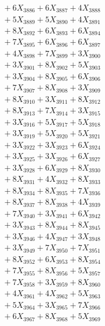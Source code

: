 \documentclass[a4paper,10pt]{article}
\begin{document}
{\begin{align}
&\;  + 6 X_{3886} + 6 X_{3887} + 4 X_{3888} \\[0.3ex]
&\;  + 5 X_{3889} + 5 X_{3890} + 4 X_{3891} \\[0.3ex]
&\;  + 8 X_{3892} + 6 X_{3893} + 6 X_{3894} \\[0.3ex]
&\;  + 7 X_{3895} + 6 X_{3896} + 6 X_{3897} \\[0.3ex]
&\;  + 4 X_{3898} + 7 X_{3899} + 3 X_{3900} \\[0.3ex]
&\;  + 3 X_{3901} + 8 X_{3902} + 5 X_{3903} \\[0.3ex]
&\;  + 3 X_{3904} + 8 X_{3905} + 6 X_{3906} \\[0.3ex]
&\;  + 7 X_{3907} + 8 X_{3908} + 3 X_{3909} \\[0.5ex]\allowbreak
&\;  + 8 X_{3910} + 3 X_{3911} + 8 X_{3912} \\[0.3ex]
&\;  + 8 X_{3913} + 7 X_{3914} + 3 X_{3915} \\[0.3ex]
&\;  + 3 X_{3916} + 5 X_{3917} + 5 X_{3918} \\[0.3ex]
&\;  + 3 X_{3919} + 5 X_{3920} + 5 X_{3921} \\[0.3ex]
&\;  + 3 X_{3922} + 3 X_{3923} + 6 X_{3924} \\[0.3ex]
&\;  + 3 X_{3925} + 3 X_{3926} + 6 X_{3927} \\[0.3ex]
&\;  + 3 X_{3928} + 6 X_{3929} + 8 X_{3930} \\[0.3ex]
&\;  + 8 X_{3931} + 4 X_{3932} + 8 X_{3933} \\[0.3ex]
&\;  + 8 X_{3934} + 8 X_{3935} + 7 X_{3936} \\[0.3ex]
&\;  + 8 X_{3937} + 8 X_{3938} + 4 X_{3939} \\[0.5ex]\allowbreak
&\;  + 7 X_{3940} + 3 X_{3941} + 6 X_{3942} \\[0.3ex]
&\;  + 3 X_{3943} + 8 X_{3944} + 8 X_{3945} \\[0.3ex]
&\;  + 3 X_{3946} + 4 X_{3947} + 3 X_{3948} \\[0.3ex]
&\;  + 3 X_{3949} + 7 X_{3950} + 7 X_{3951} \\[0.3ex]
&\;  + 8 X_{3952} + 6 X_{3953} + 8 X_{3954} \\[0.3ex]
&\;  + 7 X_{3955} + 8 X_{3956} + 5 X_{3957} \\[0.3ex]
&\;  + 7 X_{3958} + 3 X_{3959} + 8 X_{3960} \\[0.3ex]
&\;  + 4 X_{3961} + 4 X_{3962} + 5 X_{3963} \\[0.3ex]
&\;  + 5 X_{3964} + 3 X_{3965} + 7 X_{3966} \\[0.3ex]
&\;  + 6 X_{3967} + 8 X_{3968} + 5 X_{3969} \\[0.5ex]\allowbreak

\end{align}}
\end{document}
